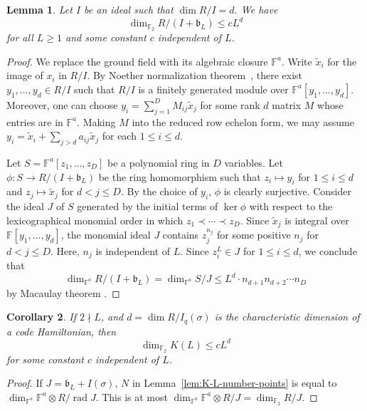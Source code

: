 \documentclass[letterpaper,12pt]{amsart}
\newtheorem{lem}{Lemma}[section]
\newtheorem{cor}[lem]{Corollary}
\theoremstyle{definition} \newtheorem{defn}{Definition}
\theoremstyle{definition} \newtheorem{rem}{Remark}
\theoremstyle{definition} \newtheorem{example}{Example}
\newcommand{\FF}{\mathbb{F}}
\newcommand{\bb}{\mathfrak{b}}
\begin{document}
\begin{lem}
Let $I$ be an ideal such that $\dim R/I = d$. We have
\[
\dim_{\FF_2} R / (I+\bb_L) \le cL^d
\]
for all $L \ge 1$ and some constant $c$ independent of $L$.
\end{lem}
\begin{proof}
We replace the ground field with its algebraic closure $\FF^a$.
Write $\tilde x_i$ for the image of $x_i$ in $R/I$.
By Noether normalization theorem~\cite[Theorem~13.3]{Eisenbud},
there exist $y_1,\ldots, y_d \in R/I$ such that
$R/I$ is a finitely generated module over $\FF^a[y_1,\ldots,y_d]$.
Moreover, one can choose $y_i = \sum_{j=1}^D M_{ij} \tilde x_j$
for some rank $d$ matrix $M$ whose entries are in $\FF^a$.
Making $M$ into the reduced row echelon form,
we may assume $y_i = \tilde x_i + \sum_{j>d} a_{ij} \tilde x_j$
for each $1 \le i \le d$.

Let $S=\FF^a[z_1,\ldots,z_D]$ be a polynomial ring in $D$ variables.
Let $\phi : S \to R/( I + \bb_L )$ be the ring homomorphism
such that $z_i \mapsto y_i$ for $1 \le i \le d$
and $z_j \mapsto \tilde x_j$ for $ d < j \le D$.
By the choice of $y_i$, $\phi$ is clearly surjective.
Consider the ideal $J$ of $S$ generated by the initial terms of $\ker \phi$ 
with respect to the lexicographical monomial order in which $z_1 \prec \cdots \prec z_D$.
Since $\tilde x_j$ is integral over $\FF[y_1,\ldots,y_d]$,
the monomial ideal $J$ contains $z_j^{n_j}$ for some positive $n_j$ for $d < j \le D$.
Here, $n_j$ is independent of $L$.
Since $z_i^L \in J$ for $1 \le i \le d$, we conclude that
\[
 \dim_{\FF^a} R/(I+\bb_L) = \dim_{\FF^a} S/J \le L^d \cdot n_{d+1} n_{d+2} \cdots n_{D}
\]
by Macaulay theorem \cite[Theorem~15.3]{Eisenbud}.
\end{proof}

\begin{cor}
If $2 \nmid L$, and $d = \dim R/I_q(\sigma)$ is the characteristic dimension of a code Hamiltonian,
then 
\[
 \dim_{\FF_2} K(L) \le c L^d
\]
for some constant $c$ independent of $L$.
\end{cor}
\begin{proof}
If $J  = \bb_L + I(\sigma)$,
$N$ in Lemma~\ref{lem:K-L-number-points} is equal to $\dim_{\FF^a} \FF^a \otimes R /\mathop{\mathrm{rad}} J$.
This is at most $\dim_{\FF^a} \FF^a \otimes R / J = \dim_{\FF_2} R/J$.
\end{proof}
\end{document}
